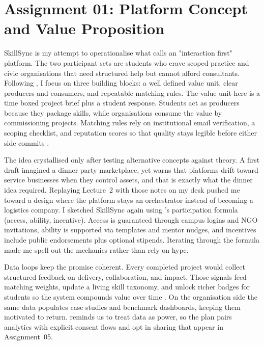 \section*{Assignment 01: Platform Concept and Value Proposition}

SkillSync is my attempt to operationalise what \citet{Choudary2016} calls an "interaction first" platform. The two participant sets are students who crave scoped practice and civic organisations that need structured help but cannot afford consultants. Following \citet{Choudary2016}, I focus on three building blocks: a well defined value unit, clear producers and consumers, and repeatable matching rules. The value unit here is a time boxed project brief plus a student response. Students act as producers because they package skills, while organisations consume the value by commissioning projects. Matching rules rely on institutional email verification, a scoping checklist, and reputation scores so that quality stays legible before either side commits \citep{Lecture02}.

The idea crystallised only after testing alternative concepts against theory. A first draft imagined a dinner party marketplace, yet \citet{Srnicek2017} warns that platforms drift toward service businesses when they control assets, and that is exactly what the dinner idea required. Replaying Lecture~2 with those notes on my desk pushed me toward a design where the platform stays an orchestrator instead of becoming a logistics company. I sketched SkillSync again using \citet{Choudary2016}'s participation formula (access, ability, incentive). Access is guaranteed through campus logins and NGO invitations, ability is supported via templates and mentor nudges, and incentives include public endorsements plus optional stipends. Iterating through the formula made me spell out the mechanics rather than rely on hype.

Data loops keep the promise coherent. Every completed project would collect structured feedback on delivery, collaboration, and impact. Those signals feed matching weights, update a living skill taxonomy, and unlock richer badges for students so the system compounds value over time \citep{Lecture05}. On the organisation side the same data populates case studies and benchmark dashboards, keeping them motivated to return. \citet{Zuboff2019} reminds us to treat data as power, so the plan pairs analytics with explicit consent flows and opt in sharing that appear in Assignment~05.

